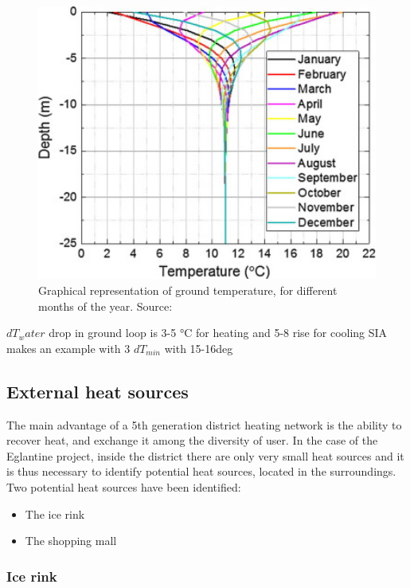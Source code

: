\documentclass{article}
\begin{document}
\begin{figure}[h!]
\centering
\includegraphics[width=1\textwidth]{GTW_temp.jpg}
\caption{Graphical representation of ground temperature, for different months of the year. Source: \cite{hanSensitivityAnalysisVertical2016}}
\label{fig:GTW_temp}
\end{figure}

$dT_water$ drop in ground loop is 3-5 \si{\celsius} for heating and 5-8 rise for cooling \cite{lundDESIGNCLOSEDLOOPGEOTHERMAL}
SIA makes an example with 3 \cite{siaSIA384Sondes2010}
$dT_{min} $ \cite{lundDESIGNCLOSEDLOOPGEOTHERMAL} with 15-16deg
\subsection{External heat sources}
The main advantage of a 5th generation district heating network is the ability to recover heat, and exchange it among the diversity of user. In the case of the Eglantine project, inside the district there are only very small heat sources and it is thus necessary to identify potential heat sources, located in the surroundings. 
Two potential heat sources have been identified:
\begin{itemize}
    \item The ice rink
    \item The shopping mall
\end{itemize}

\subsubsection{Ice rink}
\end{document}
